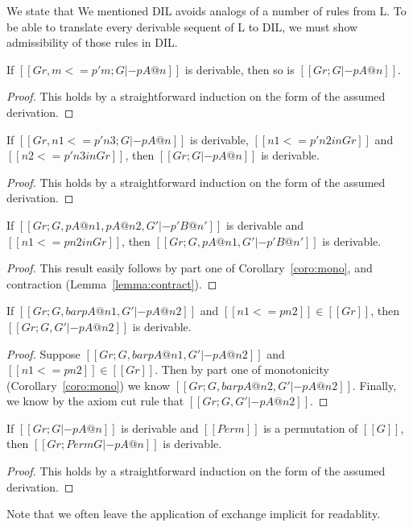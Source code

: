 We state that We mentioned DIL avoids analogs of a number of rules
from L.  To be able to translate every derivable sequent of L to DIL,
we must show admissibility of those rules in DIL.
\begin{lemma}[Reflexivity]
  \label{lemma:reflexivity}
  If $[[Gr, m <=p' m ; G |- p A @ n]]$ is derivable, then so is $[[Gr ; G |- p A @ n]]$.
\end{lemma}
  \begin{proof}
    This holds by a straightforward induction on the form of the assumed derivation.
  \end{proof}

\begin{lemma}[Transitivity]
  \label{lemma:transitivity}
  If $[[Gr, n1 <=p' n3 ; G |- p A @ n]]$ is derivable, $[[n1 <=p' n2 in Gr]]$ and $[[n2 <=p' n3 in Gr]]$, 
  then $[[Gr ; G |- p A @ n]]$ is derivable.
\end{lemma}
  \begin{proof}
    This holds by a straightforward induction on the form of the assumed derivation.
  \end{proof}

\begin{lemma}[MonoL]
  \label{lemma:monol}
  If $[[Gr ; G , p A @ n1 , p A @ n2,G' |- p' B @ n']]$ is derivable and $[[n1 <=p n2 in Gr]]$, then
  $[[Gr ; G , p A @ n1,G' |- p' B @ n']]$ is derivable.
\end{lemma}
\begin{proof}
  This result easily follows by part one of Corollary~\ref{coro:mono}, and contraction (Lemma~\ref{lemma:contract}).
\end{proof}

\begin{lemma}[MonoR]
  \label{lemma:monor}
  If $[[Gr ; G, bar p A @ n1, G' |- p A @ n2]]$ and $[[n1 <= p n2]] \in [[Gr]]$, then 
  $[[Gr ; G, G' |- p A @ n2]]$ is derivable.
\end{lemma}
  \begin{proof}
    Suppose $[[Gr ; G, bar p A @ n1, G' |- p A @ n2]]$ and $[[n1 <= p n2]] \in [[Gr]]$.
    Then by part one of monotonicity (Corollary~\ref{coro:mono}) we know 
    $[[Gr ; G, bar p A @ n2, G' |- p A @ n2]]$.  Finally, we know by the 
    axiom cut rule that $[[Gr ; G, G' |- p A @ n2]]$.    
  \end{proof}

\begin{lemma}[Exchange]
  \label{lemma:exchange}
  If $[[Gr ; G |- p A @ n]]$ is derivable and $[[Perm]]$ is a permutation of $[[G]]$, then
  $[[Gr ; Perm G |- p A @ n]]$ is derivable.
\end{lemma}
  \begin{proof}
    This holds by a straightforward induction on the form of the assumed derivation.
  \end{proof}
Note that we often leave the application of exchange implicit for
readablity.

